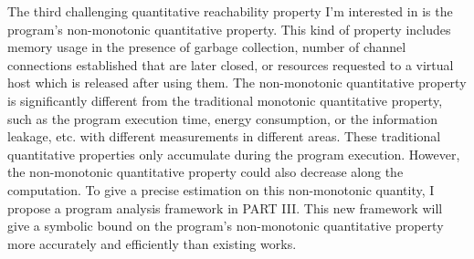 \begin{abstractpage}
{
 The third challenging quantitative reachability property I'm interested in is the program's {non-monotonic} quantitative property.
 This kind of property includes memory usage in the presence of garbage collection,
number of channel connections established that are later closed,
or resources requested to a virtual host which is released after using them. 
The non-monotonic quantitative property is significantly different from the traditional monotonic quantitative property,
such as the program execution time, energy consumption,
or the information leakage, etc. with different measurements in different areas.
These traditional quantitative properties only accumulate during the program execution. 
However, the non-monotonic quantitative property could also decrease along the computation.
To give a precise estimation on this {non-monotonic} quantity, I propose a program analysis framework in PART III.
This new framework will give
a symbolic bound on the program's non-monotonic quantitative property more accurately and efficiently
than existing works.
}
%
\end{abstractpage}
